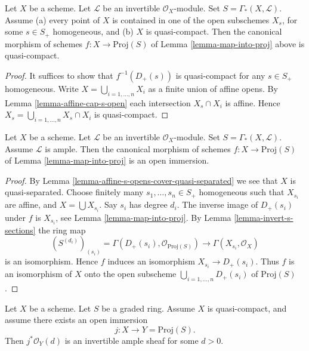 \begin{lemma}
\label{lemma-map-into-proj-quasi-compact}
Let $X$ be a scheme. Let $\mathcal{L}$ be an invertible $\mathcal{O}_X$-module.
Set $S = \Gamma_*(X, \mathcal{L})$.
Assume (a) every point of $X$ is contained in one of the
open subschemes $X_s$, for some $s \in S_{+}$ homogeneous,
and (b) $X$ is quasi-compact. Then the canonical morphism of schemes
$f : X \longrightarrow \text{Proj}(S)$ of Lemma \ref{lemma-map-into-proj}
above is quasi-compact.
\end{lemma}

\begin{proof}
It suffices to show that $f^{-1}(D_{+}(s))$ is quasi-compact
for any $s \in S_{+}$ homogeneous. Write
$X = \bigcup_{i = 1, \ldots, n} X_i$ as a finite union of
affine opens. By Lemma \ref{lemma-affine-cap-s-open} each intersection
$X_s \cap X_i$ is affine. Hence $X_s = \bigcup_{i = 1, \ldots, n} X_s \cap X_i$
is quasi-compact.
\end{proof}

\begin{lemma}
\label{lemma-ample-immersion-into-proj}
Let $X$ be a scheme. Let $\mathcal{L}$ be an invertible $\mathcal{O}_X$-module.
Set $S = \Gamma_*(X, \mathcal{L})$.
Assume $\mathcal{L}$ is ample. Then the canonical morphism of schemes
$f : X \longrightarrow \text{Proj}(S)$ of Lemma \ref{lemma-map-into-proj}
is an open immersion.
\end{lemma}

\begin{proof}
By Lemma \ref{lemma-affine-s-opens-cover-quasi-separated} we see
that $X$ is quasi-separated. Choose finitely many
$s_1, \ldots, s_n \in S_{+}$ homogeneous
such that $X_{s_i}$ are affine, and $X = \bigcup X_{s_i}$.
Say $s_i$ has degree $d_i$. The inverse image of
$D_{+}(s_i)$ under $f$ is $X_{s_i}$, see Lemma \ref{lemma-map-into-proj}.
By Lemma \ref{lemma-invert-s-sections} the ring map
$$
(S^{(d_i)})_{(s_i)} = \Gamma(D_{+}(s_i), \mathcal{O}_{\text{Proj}(S)})
\longrightarrow
\Gamma(X_{s_i}, \mathcal{O}_X)
$$
is an isomorphism. Hence $f$ induces an isomorphism
$X_{s_i} \to D_{+}(s_i)$. Thus $f$ is an isomorphism of $X$ onto the open
subscheme $\bigcup_{i = 1, \ldots, n} D_{+}(s_i)$ of $\text{Proj}(S)$.
\end{proof}

\begin{lemma}
\label{lemma-open-in-proj-ample}
Let $X$ be a scheme.
Let $S$ be a graded ring. Assume $X$ is quasi-compact,
and assume there exists an open immersion
$$
j : X \longrightarrow Y = \text{Proj}(S).
$$
Then $j^*\mathcal{O}_Y(d)$ is an invertible ample sheaf
for some $d > 0$.
\end{lemma}


